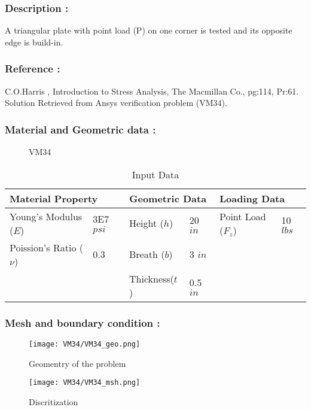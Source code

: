 \documentclass[VM.tex]{subfiles}
\begin{document}
\subsubsection*{Description : }
A triangular plate with point load (P) on one corner is tested and its opposite edge is build-in. 
\subsubsection*{Reference : }
C.O.Harris , Introduction to Stress Analysis, The Macmillan Co., pg:114, Pr:61. \\
Solution Retrieved from Ansys verification problem (VM34).

\subsubsection*{Material and Geometric data : }


\begin{figure}[h!]
\centering

\caption{VM34} \label{VM43sch}
\end{figure}
\begin{table}[ht]
\renewcommand{\arraystretch}{1.5}
\centering
\caption{Input Data}
\label{my-labelsdqf}
\begin{tabular}{|ll|ll|ll|}
\hline
\multicolumn{2}{|l|}{\cellcolor[HTML]{C0C0C0}Material Property} & \multicolumn{2}{l|}{\cellcolor[HTML]{C0C0C0}Geometric Data} & \multicolumn{2}{l|}{\cellcolor[HTML]{C0C0C0}Loading Data} \\ \hline  \hline
Young's Modulus ($E$)          & 3E7 $psi$         & Height ($h$)        & 20 $in$        & Point Load ($F_z$)        & 10 $lbs$         \\
Poission's Ratio ($\nu$)       & 0.3         & Breath ($b$)        & 3 $in$          &         &      \\ 
       &         & Thickness($t$)        & 0.5 $in$          &    &        \\ \hline
\end{tabular}
\end{table}




\subsubsection*{Mesh and boundary condition : }





\begin{figure}[h]
\centering
{}
  \texttt{[image: VM34/VM34\_geo.png]}
  \caption{Geomentry of the problem}\label{fig:awesome_image1}
\endminipage\vfill
{}
  \texttt{[image: VM34/VM34\_msh.png]}
  \caption{Discritization}\label{fig:awesome_image2}
\endminipage\vfill
\end{figure}
\end{document}
